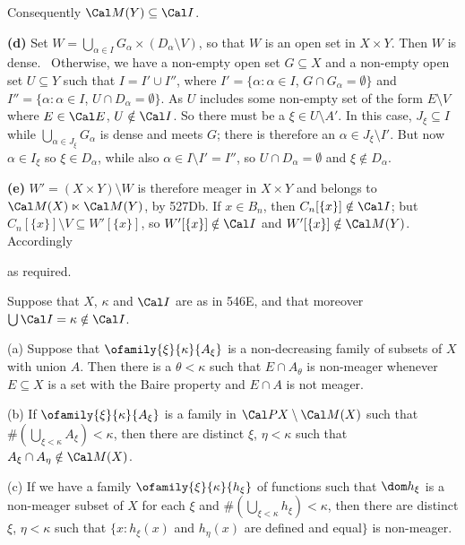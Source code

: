 {Consequently $\Cal M(Y)\subseteq\Cal I$.

\medskip

{\bf (d)}
Set $W=\bigcup_{\alpha\in I}G_{\alpha}\times(D_{\alpha}\setminus V)$, so that $W$ is
an open set in $X\times Y$.   Then $W$ is dense.
\Prf\Quer\ Otherwise, we have a non-empty open set $G\subseteq X$ and a non-empty
open set $U\subseteq Y$ such that $I=I'\cup I''$, where
$I'=\{\alpha:\alpha\in I$, $G\cap G_{\alpha}=\emptyset\}$ and
$I''=\{\alpha:\alpha\in I$, $U\cap D_{\alpha}=\emptyset\}$.   As $U$ includes some
non-empty set of the form $E\setminus V$ where $E\in\Cal E$, $U\notin\Cal I$.
So there must be a $\xi\in U\setminus A'$.   In this case, $J_{\xi}\subseteq I$
while
$\bigcup_{\alpha\in J_{\xi}}G_{\alpha}$ is dense and meets $G$;  there is therefore
an $\alpha\in J_{\xi}\setminus I'$.   But now $\alpha\in I_{\xi}$ so
$\xi\in D_{\alpha}$, while also $\alpha\in I\setminus I'=I''$, so $U\cap D_{\alpha}=\emptyset$ and $\xi\notin D_{\alpha}$.\
\Bang\Qed

\medskip

{\bf (e)} $W'=(X\times Y)\setminus W$ is therefore meager in $X\times Y$
and belongs to $\Cal M(X)\ltimes\Cal M(Y)$, by 527Db.
If $x\in B_n$, then $C_n[\{x\}]\notin\Cal I$;  but
$C_n[\{x\}]\setminus V\subseteq W'[\{x\}]$,
so $W'[\{x\}]\notin\Cal I$ and $W'[\{x\}]\notin\Cal M(Y)$.
Accordingly


\noindent as required.
}%

 Suppose that $X$, $\kappa$ and $\Cal I$ are as
in 546E, and that moreover $\bigcup\Cal I=\kappa\notin\Cal I$.

(a) Suppose that $\ofamily{\xi}{\kappa}{A_{\xi}}$ is a non-decreasing
family of subsets of $X$ with union $A$.   Then there is a
$\theta<\kappa$ such that $E\cap A_{\theta}$
is non-meager whenever $E\subseteq X$ is a set
with the Baire property and $E\cap A$ is not meager.

(b) If $\ofamily{\xi}{\kappa}{A_{\xi}}$ is a family in
$\Cal PX\setminus\Cal M(X)$ such that
$\#(\bigcup_{\xi<\kappa}A_{\xi})<\kappa$, then there are distinct $\xi$,
$\eta<\kappa$ such that $A_{\xi}\cap A_{\eta}\notin\Cal M(X)$.

(c) If we have a family $\ofamily{\xi}{\kappa}{h_{\xi}}$ of functions such that
$\dom h_{\xi}$ is a non-meager subset of $X$ for each $\xi$ and
$\#(\bigcup_{\xi<\kappa}h_{\xi})<\kappa$, then there are distinct
$\xi$, $\eta<\kappa$ such that
$\{x:h_{\xi}(x)$ and $h_{\eta}(x)$ are defined and equal$\}$ is non-meager.

